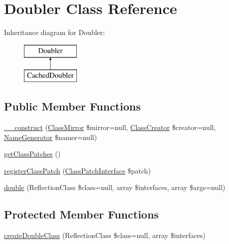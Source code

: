 \hypertarget{class_prophecy_1_1_doubler_1_1_doubler}{}\section{Doubler Class Reference}
\label{class_prophecy_1_1_doubler_1_1_doubler}
Inheritance diagram for Doubler\+:\begin{figure}[H]
\begin{center}
\leavevmode
\includegraphics[height=2.000000cm]{class_prophecy_1_1_doubler_1_1_doubler}
\end{center}
\end{figure}
\subsection*{Public Member Functions}
\begin{DoxyCompactItemize}
\item 
\mbox{\hyperlink{class_prophecy_1_1_doubler_1_1_doubler_a8902ae218ffdbb6700e93941e52f2d31}{\+\_\+\+\_\+construct}} (\mbox{\hyperlink{class_prophecy_1_1_doubler_1_1_generator_1_1_class_mirror}{Class\+Mirror}} \$mirror=null, \mbox{\hyperlink{class_prophecy_1_1_doubler_1_1_generator_1_1_class_creator}{Class\+Creator}} \$creator=null, \mbox{\hyperlink{class_prophecy_1_1_doubler_1_1_name_generator}{Name\+Generator}} \$namer=null)
\item 
\mbox{\hyperlink{class_prophecy_1_1_doubler_1_1_doubler_ab73c2d1c9302d19ac828a0c88e18d42f}{get\+Class\+Patches}} ()
\item 
\mbox{\hyperlink{class_prophecy_1_1_doubler_1_1_doubler_ac205a70b043086bf5e2868032b30289e}{register\+Class\+Patch}} (\mbox{\hyperlink{interface_prophecy_1_1_doubler_1_1_class_patch_1_1_class_patch_interface}{Class\+Patch\+Interface}} \$patch)
\item 
\mbox{\hyperlink{class_prophecy_1_1_doubler_1_1_doubler_afef9c70e781bf45cb707436abbd44465}{double}} (Reflection\+Class \$class=null, array \$interfaces, array \$args=null)
\end{DoxyCompactItemize}
\subsection*{Protected Member Functions}
\begin{DoxyCompactItemize}
\item 
\mbox{\hyperlink{class_prophecy_1_1_doubler_1_1_doubler_a33ece4af76302e33e81acfc979b8ad1d}{create\+Double\+Class}} (Reflection\+Class \$class=null, array \$interfaces)
\end{DoxyCompactItemize}


